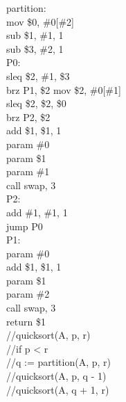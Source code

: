 \documentclass[12pt,a4paper,extrafontsizes,article]{memoir}
\begin{document}
{{\color{red}partition:}\\
{\color{violet}mov} \$0, \#0[\#2]\\
{\color{violet}sub} \$1, \#1, {\color{orange}1}\\
{\color{violet}sub} \$3, \#2, {\color{orange}1}\\
{\color{red}P0:}\\
{\color{violet}sleq} \$2, \#1, \$3\\
{\color{violet}brz} P1, \$2
{\color{violet}mov} \$2, \#0[\#1]\\
{\color{violet}sleq} \$2, \$2, \$0\\
{\color{violet}brz} P2, \$2\\
{\color{violet}add} \$1, \$1, {\color{orange}1}\\
{\color{violet}param} \#0\\
{\color{violet}param} \$1\\
{\color{violet}param} \#1\\
{\color{violet}call} swap, {\color{orange}3}\\
{\color{red}P2:}\\
{\color{violet}add} \#1, \#1, {\color{orange}1}\\
{\color{violet}jump} P0\\
{\color{red}P1:}\\
{\color{violet}param} \#0\\
{\color{violet}add} \$1, \$1, {\color{orange}1}\\
{\color{violet}param} \$1\\
{\color{violet}param} \#2\\
{\color{violet}call} swap, {\color{orange}3}\\
{\color{violet}return} \$1\\
{\color{green!50!black}//quicksort(A, p, r)}\\
{\color{green!50!black}//\hspace{32pt}if p < r}\\
{\color{green!50!black}//\hspace{32pt}\hspace{32pt}q := partition(A, p, r)}\\
{\color{green!50!black}//\hspace{32pt}\hspace{32pt}quicksort(A, p, q - 1)}\\
{\color{green!50!black}//\hspace{32pt}\hspace{32pt}quicksort(A, q + 1, r)}\\
}
\end{document}
